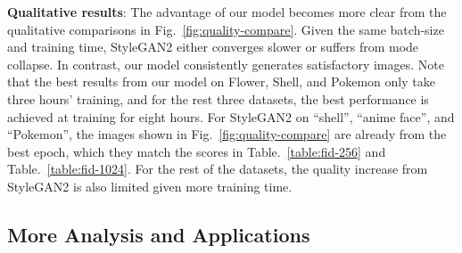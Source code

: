 \documentclass{article} \usepackage{iclr2021_conference,times}
\begin{document}
\textbf{Qualitative results}: The advantage of our model becomes more clear from the qualitative comparisons in Fig.~\ref{fig:quality-compare}. Given the same batch-size and training time, StyleGAN2 either converges slower or suffers from mode collapse. In contrast, our model consistently generates satisfactory images. Note that the best results from our model on Flower, Shell, and Pokemon only take three hours' training, and for the rest three datasets, the best performance is achieved at training for eight hours. For StyleGAN2 on “shell”, “anime face”, and “Pokemon”, the images shown in Fig.~\ref{fig:quality-compare} are already from the best epoch, which they match the scores in Table.~\ref{table:fid-256} and Table.~\ref{table:fid-1024}. For the rest of the datasets, the quality increase from StyleGAN2 is also limited given more training time. 

\subsection{More Analysis and Applications}
\end{document}
